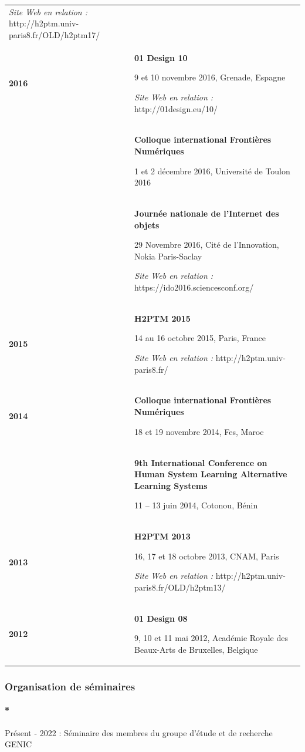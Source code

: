 \documentclass[
  a4paper,
  DIV=11,
  numbers=noendperiod]{scrreprt}
\let\oldparagraph\paragraph
\renewcommand{\paragraph}[1]{\oldparagraph{#1}\mbox{}}
\begin{document}
\begin{longtable}[]{@{}
  >{\raggedright\arraybackslash}p{}
  >{\raggedright\arraybackslash}p{}@{}}
\emph{Site Web en relation :}
http://h2ptm.univ-paris8.fr/OLD/h2ptm17/ \\
\textbf{2016} & \textbf{01 Design 10}

9 et 10 novembre 2016, Grenade, Espagne

\emph{Site Web en relation :} http://01design.eu/10/ \\
& \textbf{Colloque international Frontières Numériques}

1 et 2 décembre 2016, Université de Toulon 2016 \\
& \textbf{Journée nationale de l'Internet des objets}

29 Novembre 2016, Cité de l'Innovation, Nokia Paris-Saclay

\emph{Site Web en relation :} https://ido2016.sciencesconf.org/ \\
\textbf{2015} & \textbf{H2PTM 2015}

14 au 16 octobre 2015, Paris, France

\emph{Site Web en relation :} http://h2ptm.univ-paris8.fr/ \\
\textbf{2014} & \textbf{Colloque international Frontières Numériques}

18 et 19 novembre 2014, Fes, Maroc \\
& \textbf{9th International Conference on Human System Learning
Alternative Learning Systems}

11 -- 13 juin 2014, Cotonou, Bénin \\
\textbf{2013} & \textbf{H2PTM 2013}

16, 17 et 18 octobre 2013, CNAM, Paris

\emph{Site Web en relation :}
http://h2ptm.univ-paris8.fr/OLD/h2ptm13/ \\
\textbf{2012} & \textbf{01 Design 08}

9, 10 et 11 mai 2012, Académie Royale des Beaux-Arts de Bruxelles,
Belgique \\
\end{longtable}

\subsubsection{Organisation de séminaires}\label{sec-item300720}

\paragraph*{Présent - 2022 : Séminaire des membres du groupe d'étude et
de recherche
GENIC}\label{pruxe9sent---2022-suxe9minaire-des-membres-du-groupe-duxe9tude-et-de-recherche-genic}
\end{document}
